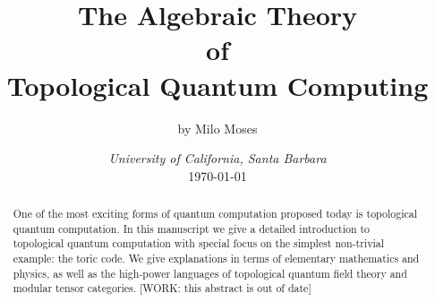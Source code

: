 \documentclass{article}
\title{The Algebraic Theory\\ of \\ Topological Quantum Computing}
\author{by Milo Moses}
\date{\textit{University of California, Santa Barbara} \\ [2ex] \today}
\theoremstyle{definition}
\numberwithin{figure}{section}
\begin{document}
\maketitle

\newcommand{\RR}{\mathbb{R}}
\newcommand{\HH}{\mathbb{H}}
\newcommand{\NN}{\mathbb{N}}
\newcommand{\QQ}{\mathbb{Q}}
\newcommand{\CC}{\mathbb{C}}
\newcommand{\FF}{\mathbb{F}}
\newcommand{\ZZ}{\mathbb{Z}}
\newcommand{\Zcal}{\mathcal{Z}}
\newcommand{\Ncal}{\mathcal{N}}
\newcommand{\LL}{\mathscr{L}}
\newcommand{\TT}{\mathcal{T}}
\newcommand{\Ccat}{\mathscr{C}}
\newcommand{\Dcat}{\mathscr{D}}
\newcommand{\Ecat}{\mathscr{E}}
\newcommand{\st}{\,\,\mathrm{s.t.}\,\,}
\newcommand{\mm}{\mathfrak{m}}
\newcommand{\pp}{\mathfrak{p}}
\newcommand{\dd}{\bold{d}}
\newcommand{\Hom}{\mathrm{Hom}}
\newcommand{\Aut}{\mathrm{Aut}}
\newcommand{\Frac}{\mathrm{Frac}}
\newcommand{\tr}{\mathrm{tr}}
\newcommand{\op}{\mathrm{op}}
\newcommand{\res}{\mathrm{res}}
\newcommand{\im}{\mathrm{im}}
\newcommand{\ev}{\mathrm{ev}}
\newcommand{\coev}{\mathrm{coev}}
\newcommand{\id}{\mathrm{id}}
\newcommand{\coker}{\mathrm{coker}}
\newcommand{\SL}{\mathrm{SL}}
\newcommand{\End}{\mathrm{End}}
\newcommand{\Rep}{\bold{Rep}}
\newcommand{\Set}{\bold{Set}}
\newcommand{\Vecc}{\bold{Vec}}
\newcommand{\Top}{\bold{Top}}
\newcommand{\Grp}{\bold{Grp}}
\newcommand{\Hilb}{\bold{Hilb}}
\newcommand{\Bord}{\bold{Bord}}
\newcommand{\FPdim}{\mathrm{FPdim}}
\newcommand{\Cat}{\bold{Cat}}
\newcommand{\func}{\mathrm{func}}
\newcommand{\0}{\left|0\right>}
\newcommand{\1}{\left|1\right>}
\newcommand{\nullclass}{\left|\bold{0}\right>}
\newcommand{\alphaclass}{\left|\alpha\right>}
\newcommand{\betaclass}{\left|\beta\right>}
\newcommand{\alphabetaclass}{\left|\alpha\beta\right>}
\newcommand{\ppsi}{\left|\psi\right>}
\newcommand{\pphi}{\left|\phi\right>}
\newcommand{\bigleadsto}{\mathlarger{\mathlarger{\mathlarger{\leadsto}}}}
\newcommand{\vin}{\rotatebox[origin=c]{-90}{$\in$}}


\begin{abstract}
One of the most exciting forms of quantum computation proposed today is topological quantum computation. In this manuscript we give a detailed introduction to topological quantum computation with special focus on the simplest non-trivial example: the toric code. We give explanations in terms of elementary mathematics and physics, as well as the high-power languages of topological quantum field theory and modular tensor categories. [WORK: this abstract is out of date]
\end{abstract}
\end{document}

